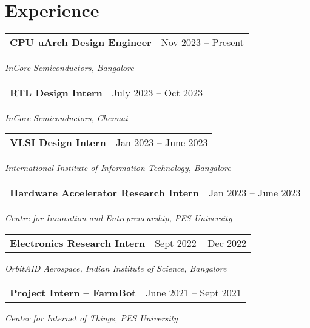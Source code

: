 \section{\sc Experience}

\begin{tabular}{@{}p{4in}p{2in}}
  {\bf{CPU uArch Design Engineer}}  & Nov 2023 – Present \\
\end{tabular}  
\textit{InCore Semiconductors, Bangalore} 

\begin{tabular}{@{}p{4in}p{2in}}
  {\bf{RTL Design Intern}}  & July 2023 – Oct 2023 \\
\end{tabular}  
\textit{InCore Semiconductors, Chennai} 


\begin{tabular}{@{}p{4in}p{2in}}
  {\bf{VLSI Design Intern}} & Jan 2023 – June 2023 \\
\end{tabular}
\textit{International Institute of Information Technology, Bangalore}  


\begin{tabular}{@{}p{4in}p{2in}}
  {\bf{Hardware Accelerator Research Intern}}  & Jan 2023 – June 2023 \\
\end{tabular}
\textit{Centre for Innovation and Entrepreneurship, PES University} 

\begin{tabular}{@{}p{4in}p{2in}}
  {\bf{Electronics Research Intern}} & Sept 2022 – Dec 2022 \\
\end{tabular}
\textit{OrbitAID Aerospace, Indian Institute of Science, Bangalore}  

\begin{tabular}{@{}p{4in}p{2in}}
  {\bf{Project Intern – FarmBot}} & June 2021 – Sept 2021 \\
\end{tabular}
\textit{Center for Internet of Things, PES University}  

\endinput
